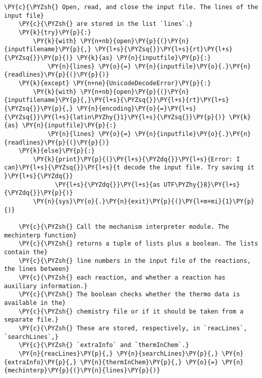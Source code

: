 \begin{Verbatim}[commandchars=\\\{\}]
    \PY{c}{\PYZsh{} Open, read, and close the input file. The lines of the input file}
    \PY{c}{\PYZsh{} are stored in the list `lines`.}
    \PY{k}{try}\PY{p}{:}
        \PY{k}{with} \PY{n+nb}{open}\PY{p}{(}\PY{n}{inputfilename}\PY{p}{,} \PY{l+s}{\PYZsq{}}\PY{l+s}{rt}\PY{l+s}{\PYZsq{}}\PY{p}{)} \PY{k}{as} \PY{n}{inputfile}\PY{p}{:}
            \PY{n}{lines} \PY{o}{=} \PY{n}{inputfile}\PY{o}{.}\PY{n}{readlines}\PY{p}{(}\PY{p}{)}
    \PY{k}{except} \PY{n+ne}{UnicodeDecodeError}\PY{p}{:}
        \PY{k}{with} \PY{n+nb}{open}\PY{p}{(}\PY{n}{inputfilename}\PY{p}{,}\PY{l+s}{\PYZsq{}}\PY{l+s}{rt}\PY{l+s}{\PYZsq{}}\PY{p}{,} \PY{n}{encoding}\PY{o}{=}\PY{l+s}{\PYZsq{}}\PY{l+s}{latin\PYZhy{}1}\PY{l+s}{\PYZsq{}}\PY{p}{)} \PY{k}{as} \PY{n}{inputfile}\PY{p}{:}
            \PY{n}{lines} \PY{o}{=} \PY{n}{inputfile}\PY{o}{.}\PY{n}{readlines}\PY{p}{(}\PY{p}{)}
    \PY{k}{else}\PY{p}{:}
        \PY{k}{print}\PY{p}{(}\PY{l+s}{\PYZdq{}}\PY{l+s}{Error: I can}\PY{l+s}{\PYZsq{}}\PY{l+s}{t decode the input file. Try saving it }\PY{l+s}{\PYZdq{}}
              \PY{l+s}{\PYZdq{}}\PY{l+s}{as UTF\PYZhy{}8}\PY{l+s}{\PYZdq{}}\PY{p}{)}
        \PY{n}{sys}\PY{o}{.}\PY{n}{exit}\PY{p}{(}\PY{l+m+mi}{1}\PY{p}{)}

    \PY{c}{\PYZsh{} Call the mechanism interpreter module. The mechinterp function}
    \PY{c}{\PYZsh{} returns a tuple of lists plus a boolean. The lists contain the}
    \PY{c}{\PYZsh{} line numbers in the input file of the reactions, the lines between}
    \PY{c}{\PYZsh{} each reaction, and whether a reaction has auxiliary information.}
    \PY{c}{\PYZsh{} The boolean checks whether the thermo data is available in the}
    \PY{c}{\PYZsh{} chemistry file or if it should be taken from a separate file.}
    \PY{c}{\PYZsh{} These are stored, respectively, in `reacLines`, `searchLines`,}
    \PY{c}{\PYZsh{} `extraInfo` and `thermInChem`.}
    \PY{n}{reacLines}\PY{p}{,} \PY{n}{searchLines}\PY{p}{,} \PY{n}{extraInfo}\PY{p}{,} \PY{n}{thermInChem}\PY{p}{,} \PY{o}{=} \PY{n}{mechinterp}\PY{p}{(}\PY{n}{lines}\PY{p}{)}


\end{Verbatim}
